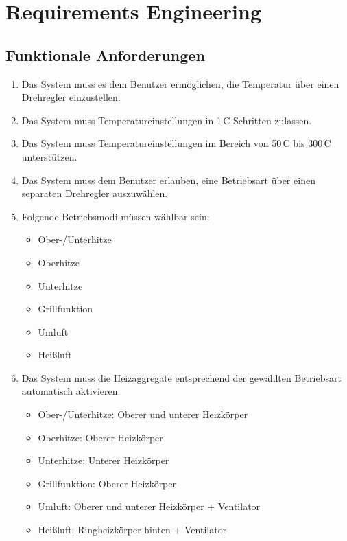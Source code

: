 \documentclass[a4paper,12pt]{article}
\begin{document}
\newpage

\section{Requirements Engineering}

\subsection{Funktionale Anforderungen}

\begin{enumerate}[label=\textbf{2.1.\arabic*}, itemsep=0pt, topsep=0pt, font=\bfseries]
    \item Das System muss es dem Benutzer ermöglichen, die Temperatur über einen Drehregler einzustellen.
    \item Das System muss Temperatureinstellungen in 1\,\textdegree{}C-Schritten zulassen.
    \item Das System muss Temperatureinstellungen im Bereich von 50\,\textdegree{}C bis 300\,\textdegree{}C unterstützen.
    \item Das System muss dem Benutzer erlauben, eine Betriebsart über einen separaten Drehregler auszuwählen.
    \item Folgende Betriebsmodi müssen wählbar sein:
    \begin{itemize}
        \item Ober-/Unterhitze
        \item Oberhitze
        \item Unterhitze
        \item Grillfunktion
        \item Umluft
        \item Heißluft
    \end{itemize}
    \item Das System muss die Heizaggregate entsprechend der gewählten Betriebsart automatisch aktivieren:
    \begin{itemize}
        \item Ober-/Unterhitze: Oberer und unterer Heizkörper
        \item Oberhitze: Oberer Heizkörper
        \item Unterhitze: Unterer Heizkörper
        \item Grillfunktion: Oberer Heizkörper
        \item Umluft: Oberer und unterer Heizkörper + Ventilator
        \item Heißluft: Ringheizkörper hinten + Ventilator

\end{itemize}
\end{enumerate}
\end{document}
